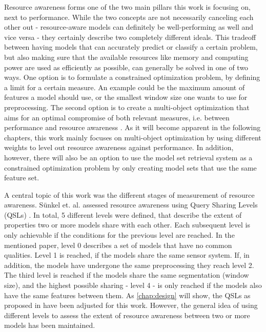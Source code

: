 Resource awareness forms one of the two main pillars this work is focusing on, next to performance. While the two concepts are not necessarily canceling each other out - resource-aware models can definitely be well-performing as well and vice versa - they certainly describe two completely different ideals. This tradeoff between having models that can accurately predict or classify a certain problem, but also making sure that the available resources like memory and computing power are used as efficiently as possible, can generally be solved in one of two ways. One option is to formulate a constrained optimization problem, by defining a limit for a certain measure. An example could be the maximum amount of features a model should use, or the smallest window size one wants to use for preprocessing. The second option is to create a multi-object optimization that aims for an optimal compromise of both relevant measures, i.e. between performance and resource awareness \cite{feurer2019}. As it will become apparent in the following chapters, this work mainly focuses on multi-object optimization by using different weights to level out resource awareness against performance. In addition, however, there will also be an option to use the model set retrieval system as a constrained optimization problem by only creating model sets that use the same feature set.

A central topic of this work was the different stages of measurement of resource awareness. Sünkel et. al. assessed resource awareness using Query Sharing Levels (QSLs) \cite{sunkel2022}. In total, 5 different levels were defined, that describe the extent of properties two or more models share with each other. Each subsequent level is only achievable if the conditions for the previous level are reached. In the mentioned paper, level 0 describes a set of models that have no common qualities. Level 1 is reached, if the models share the same sensor system. If, in addition, the models have undergone the same preprocessing they reach level 2. The third level is reached if the models share the same segmentation (window size), and the highest possible sharing - level 4 - is only reached if the models also have the same features between them. As \autoref{chap:design} will show, the QSLs as proposed in \cite{sunkel2022} have been adjusted for this work. However, the general idea of using different levels to assess the extent of resource awareness between two or more models has been maintained.

